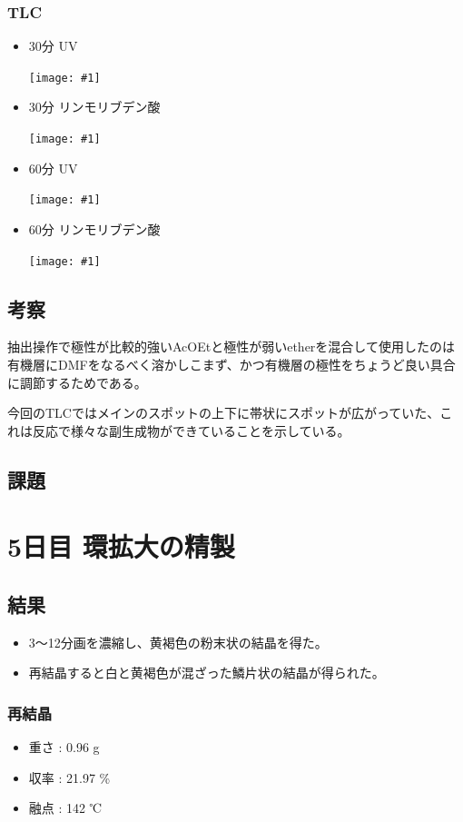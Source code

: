 \documentclass[a4paper,papersize,dvipdfmx]{jsarticle}
\newcommand{\pict}[2]{\begin{center} \texttt{[image: \#1]} \end{center}}   %
\begin{document}
\subsubsection*{TLC}
\begin{itemize}
\item 30分 UV
\pict{imgs4/tlc1.jpg}{10}
\item 30分 リンモリブデン酸
\pict{imgs4/tlc2.jpg}{10}
\item 60分 UV
\pict{imgs4/tlc3.jpg}{10}
\item 60分 リンモリブデン酸
\pict{imgs4/tlc4.jpg}{10}

\end{itemize}
\subsection*{考察}
抽出操作で極性が比較的強いAcOEtと極性が弱いetherを混合して使用したのは有機層にDMFをなるべく溶かしこまず、かつ有機層の極性をちょうど良い具合に調節するためである。

今回のTLCではメインのスポットの上下に帯状にスポットが広がっていた、これは反応で様々な副生成物ができていることを示している。

\subsection*{課題}

\section*{5日目 環拡大の精製}
\subsection*{結果}
\begin{itemize}
\item 3〜12分画を濃縮し、黄褐色の粉末状の結晶を得た。
\item 再結晶すると白と黄褐色が混ざった鱗片状の結晶が得られた。
\end{itemize}
\subsubsection*{再結晶}
\begin{itemize}
\item 重さ : 0.96 g
\item 収率 : 21.97 \%
\item 融点 : 142 ℃

\end{itemize}
\end{document}
